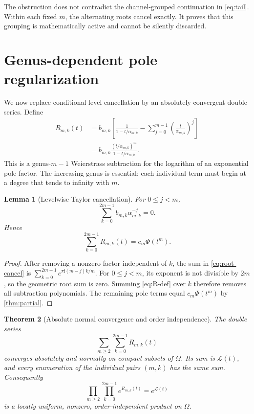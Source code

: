 \documentclass[11pt]{article}
\newtheorem{theorem}{Theorem}[section]
\newtheorem{lemma}[theorem]{Lemma}
\newcommand{\Lm}{\mathcal L}
\newcommand{\ii}{\mathrm i}
\begin{document}
The obstruction does not contradict the channel-grouped continuation in
\eqref{eq:tail}.  Within each fixed $m$, the alternating roots cancel exactly.
It proves that this grouping is mathematically active and cannot be silently
discarded.

\section{Genus-dependent pole regularization}

We now replace conditional level cancellation by an absolutely convergent
double series.  Define
\begin{align}
 R_{m,k}(t)
 &=b_{m,k}\left[
   \frac1{1-t/\alpha_{m,k}}
   -\sum_{j=0}^{m-1}\left(\frac{t}{\alpha_{m,k}}\right)^j
   \right] \label{eq:R-def}\\
 &=b_{m,k}\frac{(t/\alpha_{m,k})^m}
 {1-t/\alpha_{m,k}}. \label{eq:R-tail}
\end{align}
This is a genus-$m-1$ Weierstrass subtraction for the logarithm of an
exponential pole factor.  The increasing genus is essential: each
individual term must begin at a degree that tends to infinity with $m$.

\begin{lemma}[Levelwise Taylor cancellation]\label{lem:cancellation}
For $0\le j<m$,
\begin{equation}\label{eq:root-cancel}
 \sum_{k=0}^{2m-1}b_{m,k}\alpha_{m,k}^{-j}=0.
\end{equation}
Hence
\begin{equation}\label{eq:level-identity}
 \sum_{k=0}^{2m-1}R_{m,k}(t)=c_m\Phi(t^m).
\end{equation}
\end{lemma}

\begin{proof}
After removing a nonzero factor independent of $k$, the sum in
\eqref{eq:root-cancel} is
$\sum_{k=0}^{2m-1}e^{\pi\ii(m-j)k/m}$.  For $0\le j<m$, its exponent is not
divisible by $2m$, so the geometric root sum is zero.  Summing
\eqref{eq:R-def} over $k$ therefore removes all subtraction polynomials.
The remaining pole terms equal $c_m\Phi(t^m)$ by \cref{thm:partial}.
\end{proof}

\begin{theorem}[Absolute normal convergence and order independence]
\label{thm:normal}
The double series
\begin{equation}\label{eq:regularized-double}
 \sum_{m\ge2}\sum_{k=0}^{2m-1}R_{m,k}(t)
\end{equation}
converges absolutely and normally on compact subsets of $\Omega$.  Its sum
is $\Lm(t)$, and every enumeration of the individual pairs $(m,k)$ has the
same sum.  Consequently
\begin{equation}\label{eq:pole-product}
 \prod_{m\ge2}\prod_{k=0}^{2m-1}e^{R_{m,k}(t)}
 =e^{\Lm(t)}
\end{equation}
is a locally uniform, nonzero, order-independent product on $\Omega$.
\end{theorem}
\end{document}

